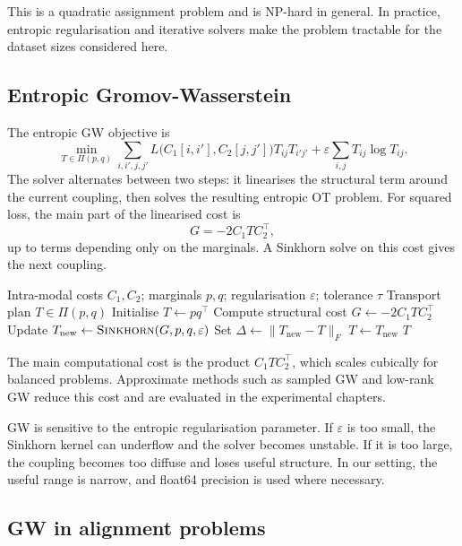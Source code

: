 This is a quadratic assignment problem and is NP-hard in general. In practice, entropic regularisation and iterative solvers make the problem tractable for the dataset sizes considered here.

\subsection{Entropic Gromov-Wasserstein}

The entropic GW objective is
\[
\min_{T \in \Pi(p,q)}
\sum_{i,i',j,j'}
L\big(C_1[i,i'],C_2[j,j']\big)
T_{ij}T_{i'j'}
+
\varepsilon \sum_{i,j} T_{ij}\log T_{ij}.
\]
The solver alternates between two steps: it linearises the structural term around the current coupling, then solves the resulting entropic OT problem. For squared loss, the main part of the linearised cost is
\[
G = -2 C_1 T C_2^\top,
\]
up to terms depending only on the marginals. A Sinkhorn solve on this cost gives the next coupling.

\begin{algorithm}[ht]
\caption{Entropic Gromov-Wasserstein}
\label{alg:egw}
\begin{algorithmic}[1]
\Require Intra-modal costs $C_1,C_2$; marginals $p,q$; regularisation $\varepsilon$; tolerance $\tau$
\Ensure Transport plan $T \in \Pi(p,q)$
\State Initialise $T \gets p q^\top$
\Repeat
    \State Compute structural cost $G \gets -2 C_1 T C_2^\top$
    \State Update $T_{\mathrm{new}} \gets \textsc{Sinkhorn}(G,p,q,\varepsilon)$
    \State Set $\Delta \gets \|T_{\mathrm{new}}-T\|_F$
    \State $T \gets T_{\mathrm{new}}$
\Until{$\Delta < \tau$}
\State \Return $T$
\end{algorithmic}
\end{algorithm}

The main computational cost is the product $C_1 T C_2^\top$, which scales cubically for balanced problems. Approximate methods such as sampled GW \cite{kerdoncuff2021sampled} and low-rank GW \cite{scetbon2022lowrank} reduce this cost and are evaluated in the experimental chapters.

GW is sensitive to the entropic regularisation parameter. If $\varepsilon$ is too small, the Sinkhorn kernel can underflow and the solver becomes unstable. If it is too large, the coupling becomes too diffuse and loses useful structure. In our setting, the useful range is narrow, and float64 precision is used where necessary.

\subsection{GW in alignment problems}

